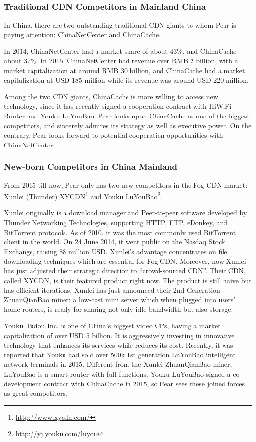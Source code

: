 \subsubsection{Traditional CDN Competitors in Mainland China}
In China, there are two outstanding traditional CDN giants to whom Pear is paying attention: ChinaNetCenter and ChinaCache.

In 2014, ChinaNetCenter had a market share of about 43\%, and ChinaCache about 37\%. In 2015, ChinaNetCenter had revenue over RMB 2 billion, with a market capitalization at around RMB 30 billion, and ChinaCache had a market capitalization at USD 185 million while its revenue was around USD 220 million. 

Among the two CDN giants, ChinaCache is more willing to access new technology, since it has recently signed a cooperation contract with HiWiFi Router and Youku LuYouBao. Pear looks upon ChinaCache as one of the biggest competitors, and sincerely admires its strategy as well as executive power. On the contrary, Pear looks forward to potential cooperation opportunities with ChinaNetCenter. 

\subsubsection{New-born Competitors in China Mainland}
From 2015 till now, Pear only has two new competitors in the Fog CDN market: Xunlei (Thunder) XYCDN\footnote{\url{http://www.xycdn.com/}} and Youku LuYouBao\footnote{\url{http://yj.youku.com/luyou}}.

Xunlei originally is a download manager and Peer-to-peer software developed by Thunder Networking Technologies, supporting HTTP, FTP, eDonkey, and BitTorrent protocols. As of 2010, it was the most commonly used BitTorrent client in the world. On 24 June 2014, it went public on the Nasdaq Stock Exchange, raising 88 million USD. Xunlei's advantage concentrates on file downloading techniques which are essential for Fog CDN. Moreover, now Xunlei has just adjusted their strategic direction to ``crowd-sourced CDN''. Their CDN, called XYCDN, is their featured product right now. The product is still naive but has efficient iterations. Xunlei has just announced their 2nd Generation ZhuanQianBao miner: a low-cost mini server which when plugged into users' home routers, is ready for sharing not only idle bandwidth but also storage.

Youku Tudou Inc. is one of China's biggest video CPs, having a market capitalization of over USD 5 billion. It is aggressively investing in innovative technology that enhances its services while reduces its cost. Recently, it was reported that Youku had sold over 500k 1st generation LuYouBao intelligent network terminals in 2015. Different from the Xunlei ZhuanQianBao miner, LuYouBao is a smart router with full functions. Youku LuYouBao signed a co-development contract with ChinaCache in 2015, so Pear sees these joined forces as great competitors. 

